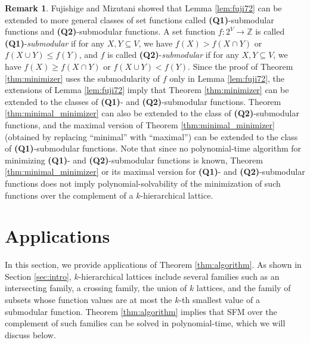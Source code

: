 \documentclass[11pt,letterpaper]{article}
\theoremstyle{plain}
\theoremstyle{definition}
\newtheorem{remark}[theorem]{Remark}
\begin{document}
\begin{remark}
Fujishige and Mizutani \cite{fujishige2026} showed that Lemma \ref{lem:fuji72} can be extended to more general classes of set functions called {\bf (Q1)}-submodular functions and {\bf (Q2)}-submodular functions.
A set function $f:2^V\to \mathbb{Z}$ is called {\bf (Q1)}-\textit{submodular} if for any $X,Y\subseteq V$, we have $f(X)>f(X\cap Y)$ or $f(X\cup Y)\le f(Y)$, and $f$ is called {\bf (Q2)}-\textit{submodular} if for any $X,Y\subseteq V$, we have $f(X)\ge f(X\cap Y)$ or $f(X\cup Y)< f(Y)$.
Since the proof of Theorem \ref{thm:minimizer} uses the submodularity of $f$ only in Lemma \ref{lem:fuji72}, the extensions of Lemma \ref{lem:fuji72} imply that Theorem \ref{thm:minimizer} can be extended to the classes of {\bf (Q1)}- and {\bf (Q2)}-submodular functions.
Theorem \ref{thm:minimal_minimizer} can also be extended to the class of {\bf (Q2)}-submodular functions, and the maximal version of Theorem \ref{thm:minimal_minimizer} (obtained by replacing ``minimal'' with ``maximal'') can be extended to the class of {\bf (Q1)}-submodular functions.
Note that since no polynomial-time algorithm for minimizing {\bf (Q1)}- and {\bf (Q2)}-submodular functions is known, Theorem \ref{thm:minimal_minimizer} or its maximal version for {\bf (Q1)}- and {\bf (Q2)}-submodular functions does not imply polynomial-solvability of the minimization of such functions over the complement of a $k$-hierarchical lattice.
\end{remark}

\section{Applications}
\label{sec:app}
In this section, we provide applications of Theorem \ref{thm:algorithm}.
As shown in Section \ref{sec:intro}, $k$-hierarchical lattices include several families such as an intersecting family, a crossing family, the union of $k$ lattices, and the family of subsets whose function values are at most the  $k$-th smallest value of a submodular function.
Theorem \ref{thm:algorithm} implies that SFM over the complement of such families can be solved in polynomial-time, which we will discuss below.
\end{document}
